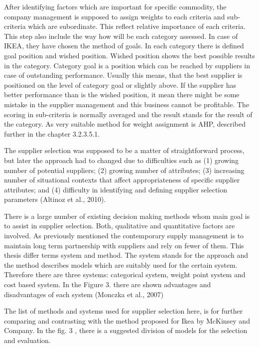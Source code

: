 \documentclass[oneside,12pt]{article}%
\begin{document}
After identifying factors which are important for specific commodity, the company management is supposed to assign weights to each criteria and sub-criteria which are subordinate. This reflect relative importance of each criteria. This step also include the way how will be each category assessed. In case of IKEA, they have chosen the method of goals. In each category there is defined goal position and wished position. Wished position shows the best possible results in the category. Category goal is a position which can be reached by suppliers in case of outstanding performance. Usually this means, that the best supplier is positioned on the level of category goal or slightly above. If the supplier has better performance than is the wished position, it mean there might be some mistake in the supplier management and this business cannot be profitable. The scoring in sub-criteria is normally averaged and the result stands for the result of the category. As very suitable method for weight assignment is AHP, described further in the chapter 3.2.3.5.1.


The supplier selection was supposed to be a matter of straightforward process, but later the approach had to changed due to difficulties such as (1) growing number of potential suppliers; (2) growing number of attributes; (3) increasing number of situational contexts that affect appropriateness of specific supplier attributes; and (4) difficulty in identifying and defining supplier selection parameters (Altinoz et al., 2010). \par
There is a large number of existing decision making methods whom main goal is to assist in supplier selection. Both, qualitative and quantitative factors are involved. As previously mentioned the contemporary supply management is to maintain long term partnership with suppliers and rely on fewer of them. This thesis differ terms system and method. The system stands for the approach and the method describes models which are suitably used for the certain system. Therefore there are three systems: categorical system, weight point system and cost based system. In the Figure 3. there are shown advantages and disadvantages of each system (Monczka et al., 2007)\par
The list of methods and systems used for supplier selection here, is for further comparing and contrasting with the method proposed for Ikea by McKinsey and Company. In the fig. 3 , there is a suggested division of models for the selection and evaluation.
\end{document}
